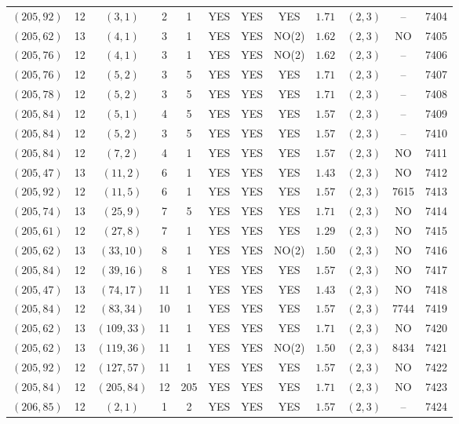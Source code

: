 \begin{longtable}{|c|c|c|c|c|c|c|c|c|c|c|c|}
$(205,92)$ & 12 & $(3,1)$ & 2 & 1 & YES & YES & YES & $1.71$ & $(2,3)$ & -- & 7404\\
$(205,62)$ & 13 & $(4,1)$ & 3 & 1 & YES & YES & NO(2) & $1.62$ & $(2,3)$ & NO & 7405\\
$(205,76)$ & 12 & $(4,1)$ & 3 & 1 & YES & YES & NO(2) & $1.62$ & $(2,3)$ & -- & 7406\\
$(205,76)$ & 12 & $(5,2)$ & 3 & 5 & YES & YES & YES & $1.71$ & $(2,3)$ & -- & 7407\\
$(205,78)$ & 12 & $(5,2)$ & 3 & 5 & YES & YES & YES & $1.71$ & $(2,3)$ & -- & 7408\\
$(205,84)$ & 12 & $(5,1)$ & 4 & 5 & YES & YES & YES & $1.57$ & $(2,3)$ & -- & 7409\\
$(205,84)$ & 12 & $(5,2)$ & 3 & 5 & YES & YES & YES & $1.57$ & $(2,3)$ & -- & 7410\\
$(205,84)$ & 12 & $(7,2)$ & 4 & 1 & YES & YES & YES & $1.57$ & $(2,3)$ & NO & 7411\\
$(205,47)$ & 13 & $(11,2)$ & 6 & 1 & YES & YES & YES & $1.43$ & $(2,3)$ & NO & 7412\\
$(205,92)$ & 12 & $(11,5)$ & 6 & 1 & YES & YES & YES & $1.57$ & $(2,3)$ & 7615 & 7413\\
$(205,74)$ & 13 & $(25,9)$ & 7 & 5 & YES & YES & YES & $1.71$ & $(2,3)$ & NO & 7414\\
$(205,61)$ & 12 & $(27,8)$ & 7 & 1 & YES & YES & YES & $1.29$ & $(2,3)$ & NO & 7415\\
$(205,62)$ & 13 & $(33,10)$ & 8 & 1 & YES & YES & NO(2) & $1.50$ & $(2,3)$ & NO & 7416\\
$(205,84)$ & 12 & $(39,16)$ & 8 & 1 & YES & YES & YES & $1.57$ & $(2,3)$ & NO & 7417\\
$(205,47)$ & 13 & $(74,17)$ & 11 & 1 & YES & YES & YES & $1.43$ & $(2,3)$ & NO & 7418\\
$(205,84)$ & 12 & $(83,34)$ & 10 & 1 & YES & YES & YES & $1.57$ & $(2,3)$ & 7744 & 7419\\
$(205,62)$ & 13 & $(109,33)$ & 11 & 1 & YES & YES & YES & $1.71$ & $(2,3)$ & NO & 7420\\
$(205,62)$ & 13 & $(119,36)$ & 11 & 1 & YES & YES & NO(2) & $1.50$ & $(2,3)$ & 8434 & 7421\\
$(205,92)$ & 12 & $(127,57)$ & 11 & 1 & YES & YES & YES & $1.57$ & $(2,3)$ & NO & 7422\\
$(205,84)$ & 12 & $(205,84)$ & 12 & 205 & YES & YES & YES & $1.71$ & $(2,3)$ & NO & 7423\\
$(206,85)$ & 12 & $(2,1)$ & 1 & 2 & YES & YES & YES & $1.57$ & $(2,3)$ & -- & 7424\\

\end{longtable}
